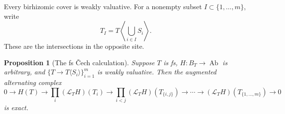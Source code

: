 \documentclass[11pt]{article}
\newtheorem{proposition}[theorem]{Proposition}
\theoremstyle{definition}
\theoremstyle{remark}
\DeclareMathOperator{\Ab}{Ab}
\newcommand{\LL}{\mathcal L}
\begin{document}
Every birhizomic cover is weakly valuative. For a nonempty subset
\(I\subset\{1,\ldots,m\}\), write
\[
T_I=T\left\langle\bigcup_{i\in I}S_i\right\rangle.
\]
These are the intersections in the opposite site.

\begin{proposition}[The fs \v{C}ech calculation]\label{prop:fs-cech}
Suppose \(T\) is fs, \(H:B_T\to\Ab\) is arbitrary, and
\(\{T\to T\langle S_i\rangle\}_{i=1}^m\) is weakly valuative.
Then the augmented alternating complex
\begin{equation}\label{eq:cech}
0\longrightarrow H(T)
\longrightarrow \prod_i(\LL_TH)(T_i)
\longrightarrow \prod_{i<j}(\LL_TH)(T_{\{i,j\}})
\longrightarrow\cdots
\longrightarrow(\LL_TH)(T_{\{1,\ldots,m\}})
\longrightarrow0
\end{equation}
is exact.
\end{proposition}

\end{document}
